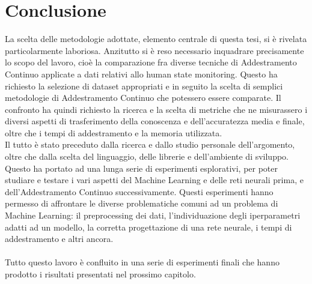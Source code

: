 \section{Conclusione}
La scelta delle metodologie adottate, elemento centrale di questa tesi, si è rivelata particolarmente laboriosa. Anzitutto si è reso necessario inquadrare precisamente lo scopo del lavoro, cioè la comparazione fra diverse tecniche di Addestramento Continuo applicate a dati relativi allo human state monitoring. Questo ha richiesto la selezione di dataset appropriati e in seguito la scelta di semplici metodologie di Addestramento Continuo che potessero essere comparate. Il confronto ha quindi richiesto la ricerca e la scelta di metriche che ne misurassero i diversi aspetti di trasferimento della conoscenza e dell'accuratezza media e finale, oltre che i tempi di addestramento e la memoria utilizzata.\\
Il tutto è stato preceduto dalla ricerca e dallo studio personale dell'argomento, oltre che dalla scelta del linguaggio, delle librerie e dell'ambiente di sviluppo. Questo ha portato ad una lunga serie di esperimenti esplorativi, per poter studiare e testare i vari aspetti del Machine Learning e delle reti neurali prima, e dell'Addestramento Continuo successivamente. Questi esperimenti hanno permesso di affrontare le diverse problematiche comuni ad un problema di Machine Learning: il preprocessing dei dati, l'individuazione degli iperparametri adatti ad un modello, la corretta progettazione di una rete neurale, i tempi di addestramento e altri ancora.\\\\
Tutto questo lavoro è confluito in una serie di esperimenti finali che hanno prodotto i risultati presentati nel prossimo capitolo.


